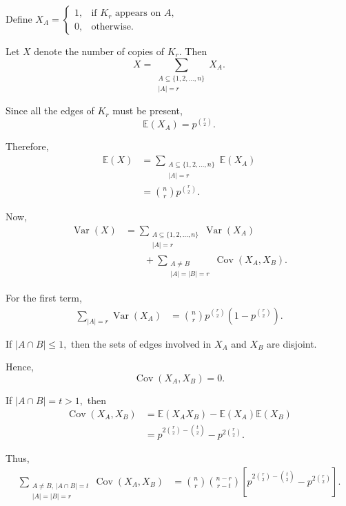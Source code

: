 Define
\(
    X_A
    =
    \begin{cases}
        1, & \text{if $K_r$ appears on $A$},\\
        0, & \text{otherwise}.
    \end{cases}
\)

Let $X$ denote the number of copies of $K_r$. Then
\[
    X
    =
    \sum_{\substack{
        A\subseteq\{1,2,\ldots,n\}\\
        |A|=r
    }}
    X_A.
\]

Since all the edges of $K_r$ must be present,
\[
    \mathbb{E}(X_A)
    =
    p^{\binom{r}{2}}.
\]

Therefore,
\[
\begin{aligned}
    \mathbb{E}(X)
    &=
    \sum_{\substack{
        A\subseteq\{1,2,\ldots,n\}\\
        |A|=r
    }}
    \mathbb{E}(X_A) \\
    &=
    \binom{n}{r}
    p^{\binom{r}{2}}.
\end{aligned}
\]

Now,
\[
\begin{aligned}
    \operatorname{Var}(X)
    &=
    \sum_{\substack{
        A\subseteq\{1,2,\ldots,n\}\\
        |A|=r
    }}
    \operatorname{Var}(X_A) \\
    &\qquad+
    \sum_{\substack{
        A\neq B\\
        |A|=|B|=r
    }}
    \operatorname{Cov}(X_A,X_B).
\end{aligned}
\]

For the first term,
\[
\begin{aligned}
    \sum_{|A|=r}\operatorname{Var}(X_A)
    &=
    \binom{n}{r}
    p^{\binom{r}{2}}
    \left(
        1-p^{\binom{r}{2}}
    \right).
\end{aligned}
\]

If
\(
    |A\cap B|\leq 1,
\)
then the sets of edges involved in $X_A$ and $X_B$ are disjoint.

Hence,
\[
    \operatorname{Cov}(X_A,X_B)=0.
\]

If
\(
    |A\cap B|=t>1,
\)
then
\[
\begin{aligned}
    \operatorname{Cov}(X_A,X_B)
    &=
    \mathbb{E}(X_AX_B)
    -
    \mathbb{E}(X_A)\mathbb{E}(X_B) \\
    &=
    p^{
        2\binom{r}{2}-\binom{t}{2}
    }
    -
    p^{2\binom{r}{2}}.
\end{aligned}
\]

Thus,
\[
\begin{aligned}
    \sum_{\substack{
        A\neq B,\,
        |A\cap B|=t\\
        |A|=|B|=r
    }}
    \operatorname{Cov}(X_A,X_B)
    &=
    \binom{n}{r}
    \binom{n-r}{r-t}
    \left[
        p^{
            2\binom{r}{2}-\binom{t}{2}
        }
        -
        p^{2\binom{r}{2}}
    \right].
\end{aligned}
\]

